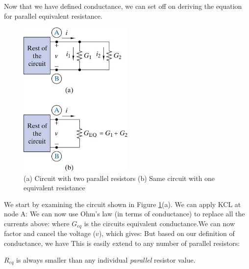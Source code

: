 \documentclass{handout}
\begin{document}
Now that we have defined conductance, we can set off on deriving the equation for parallel equivalent resistance.

\begin{figure}[h t b]
\centering
\includegraphics[width=0.5\textwidth]{ParallelReq.jpg}
\caption{(a) Circuit with two parallel resistors (b) Same circuit with one equivalent resistance}
\label{fig: ParallelReq}
\end{figure}

We start by examining the circuit shown in Figure \ref{fig: ParallelReq}(a). We can apply KCL at node A:
We can now use Ohm's law (in terms of conductance) to replace all the currents above:
where $G_{eq}$ is the circuits equivalent conductance.We can now factor and cancel the voltage ($v$), which gives:
But based on our definition of conductance, we have
This is easily extend to any number of parallel resistors:

$R_{eq}$ is always smaller than any individual {\em parallel} resistor value.
\end{document}
